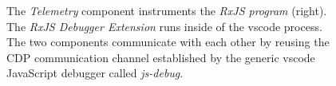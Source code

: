 \begin{figure}
  \caption{The \emph{Telemetry} component instruments the \emph{RxJS program} (right). The \emph{RxJS Debugger Extension} runs inside of the vscode process. The two components communicate with each other by reusing the CDP communication channel established by the generic vscode JavaScript debugger called \emph{js-debug}.}
  \label{fig:architecture}
\end{figure}
